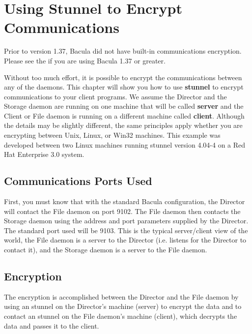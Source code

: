 
\chapter{Using Stunnel to Encrypt Communications}
\label{StunnelChapter}

Prior to version 1.37, Bacula did not have built-in communications encryption.
Please see the  if you are using Bacula
1.37 or greater.

Without too much effort, it is possible to encrypt the communications
between any of the daemons. This chapter will show you how to use {\bf
stunnel} to encrypt communications to your client programs. We assume the
Director and the Storage daemon are running on one machine that will be called
{\bf server} and the Client or File daemon is running on a different machine
called {\bf client}. Although the details may be slightly different, the same
principles apply whether you are encrypting between Unix, Linux, or Win32
machines. This example was developed between two Linux machines running
stunnel version 4.04-4 on a Red Hat Enterprise 3.0 system.

\section{Communications Ports Used}

First, you must know that with the standard Bacula configuration, the Director
will contact the File daemon on port 9102. The File daemon then contacts the
Storage daemon using the address and port parameters supplied by the Director.
The standard port used will be 9103. This is the typical server/client view of
the world, the File daemon is a server to the Director (i.e. listens for the
Director to contact it), and the Storage daemon is a server to the File
daemon.

\section{Encryption}

The encryption is accomplished between the Director and the File daemon by
using an stunnel on the Director's machine (server) to encrypt the data and to
contact an stunnel on the File daemon's machine (client), which decrypts the
data and passes it to the client.

